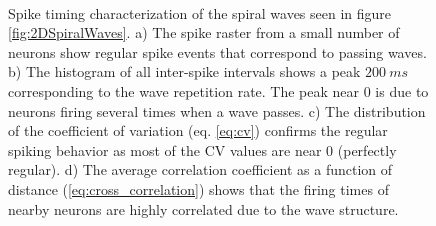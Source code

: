 \documentclass[12pt]{article}
\begin{document}
\begin{figure}[!htb]
 \caption{Spike timing characterization of the spiral waves seen in figure \ref{fig:2DSpiralWaves}.
          a) The spike raster from a small number of neurons show regular spike events that correspond to passing waves.
          b) The histogram of all inter-spike intervals shows a peak $200~ms$ corresponding to the wave repetition rate. The peak near 0 is due to neurons firing several times when a wave passes. 
          c) The distribution of the coefficient of variation (eq. \ref{eq:cv}) confirms the regular spiking behavior as most of the CV values are near 0 (perfectly regular).
          d) The average correlation coefficient as a function of distance (\ref{eq:cross_correlation}) shows that the firing times of nearby neurons are highly correlated due to the wave structure.
          } 
     \\
 \label{fig:2DSpiralWave_SpikeTiming}
\end{figure}
 \FloatBarrier
 
\end{document}
